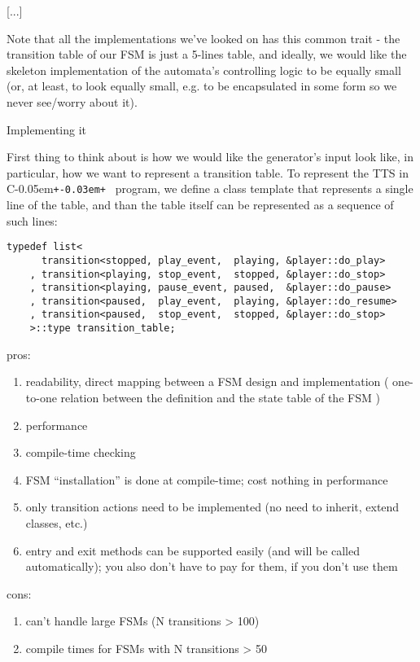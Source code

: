 \documentclass{kapproc}
\newcommand{\Cpp}{C\kern-0.05em\texttt{+\kern-0.03em+}%
}
\begin{document}
[...]

Note that all the implementations we've looked on has this common 
trait - the transition table of our FSM is just a 5-lines table, 
and ideally, we would like the skeleton implementation of the 
automata's controlling logic to be equally small (or, at least, 
to look equally small, e.g. to be encapsulated in some form so 
we never see/worry about it). 

Implementing it

First thing to think about is how we would like the generator's 
input look like, in particular, how we want to represent a 
transition table. To represent the TTS in \Cpp\ program, we define 
a  class template that represents a single line 
of the table, and than the table itself can be represented as a 
sequence of such lines:

{\small
\begin{codesamp}\begin{verbatim}
typedef list<
      transition<stopped, play_event,  playing, &player::do_play>
    , transition<playing, stop_event,  stopped, &player::do_stop>
    , transition<playing, pause_event, paused,  &player::do_pause>
    , transition<paused,  play_event,  playing, &player::do_resume>
    , transition<paused,  stop_event,  stopped, &player::do_stop>
    >::type transition_table;
\end{verbatim}
\end{codesamp}
}

pros:
\begin{enumerate}
\item readability, direct mapping between a FSM design and 
    implementation ( one-to-one relation between the 
    definition and the state table of the FSM )
\item performance %
\item compile-time checking 
\item FSM ``installation'' is done at compile-time; cost 
    nothing in performance 
\item only transition actions need to be implemented 
    (no need to inherit, extend classes, etc.) 
\item entry and exit methods can be supported easily 
    (and will be called automatically); you also don't have 
    to pay for them, if you don't use them 
\end{enumerate}

cons:
\begin{enumerate}
\item can't handle large FSMs (N transitions > 100) 
\item compile times for FSMs with N transitions > 50 
\end{enumerate}
\end{document}

